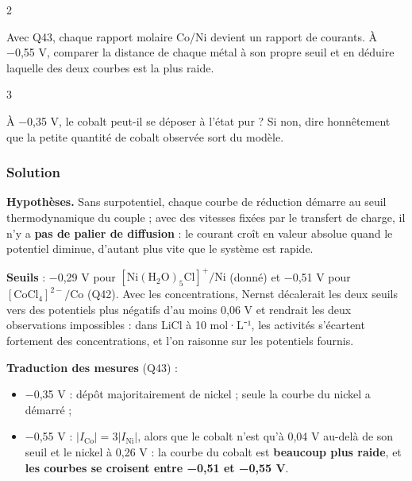 \documentclass[11pt,a4paper]{article}
\providecommand{\tightlist}{\setlength{\itemsep}{0pt}\setlength{\parskip}{0pt}}
\begin{document}
\begin{indication}{2}

Avec Q43, chaque rapport molaire Co/Ni devient un rapport de courants. À −0,55 V, comparer la distance de chaque métal à son propre seuil et en déduire laquelle des deux courbes est la plus raide.

\end{indication}

\begin{indication}{3}

À −0,35 V, le cobalt peut-il se déposer à l'état pur ? Si non, dire honnêtement que la petite quantité de cobalt observée sort du modèle.

\end{indication}

\hypertarget{solution-43}{%
\subsubsection{Solution}\label{solution-43}}

\textbf{Hypothèses.} Sans surpotentiel, chaque courbe de réduction démarre au seuil thermodynamique du couple ; avec des vitesses fixées par le transfert de charge, il n'y a \textbf{pas de palier de diffusion} : le courant croît en valeur absolue quand le potentiel diminue, d'autant plus vite que le système est rapide.

\textbf{Seuils} : −0,29 V pour \([\mathrm{Ni(H_2O)_5Cl}]^+/\mathrm{Ni}\) (donné) et −0,51 V pour \([\mathrm{CoCl_4}]^{2-}/\mathrm{Co}\) (Q42). Avec les concentrations, Nernst décalerait les deux seuils vers des potentiels plus négatifs d'au moins 0,06 V et rendrait les deux observations impossibles : dans LiCl à 10 mol·L⁻¹, les activités s'écartent fortement des concentrations, et l'on raisonne sur les potentiels fournis.

\textbf{Traduction des mesures} (Q43) :

\begin{itemize}
\tightlist
\item
  −0,35 V : dépôt majoritairement de nickel ; seule la courbe du nickel a démarré ;
\item
  −0,55 V : \(\lvert I_{\mathrm{Co}}\rvert=3\lvert I_{\mathrm{Ni}}\rvert\), alors que le cobalt n'est qu'à 0,04 V au-delà de son seuil et le nickel à 0,26 V : la courbe du cobalt est \textbf{beaucoup plus raide}, et \textbf{les courbes se croisent entre −0,51 et −0,55 V}.
\end{itemize}
\end{document}
